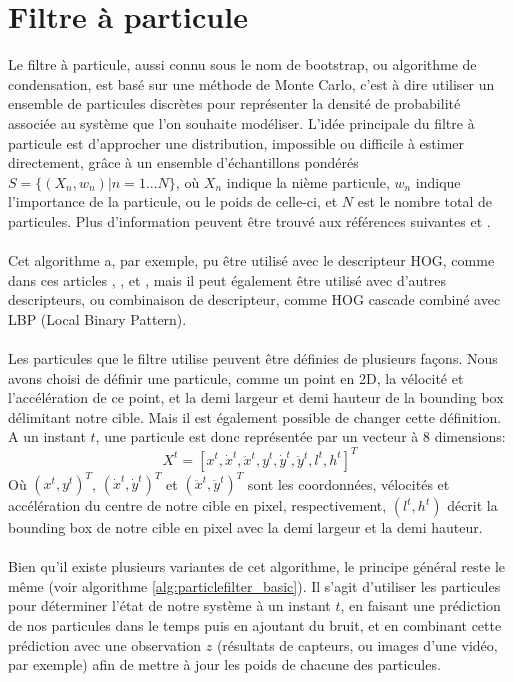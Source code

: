 \section{Filtre à particule}
Le filtre à particule, aussi connu sous le nom de bootstrap, ou algorithme de condensation, est basé sur une méthode de Monte Carlo, c'est à dire utiliser un ensemble de particules discrètes pour représenter la densité de probabilité associée au système que l'on souhaite modéliser. L'idée principale du filtre à particule est d'approcher une distribution, impossible ou difficile à estimer directement, grâce à un ensemble d'échantillons pondérés $S=\{(X_{n}, w_{n})|n=1...N\}$, où $X_{n}$ indique la nième particule, $w_{n}$ indique l'importance de la particule, ou le poids de celle-ci, et $N$ est le nombre total de particules. Plus d'information peuvent être trouvé aux références suivantes \cite{russell_norvig} et \cite{rlabbe}.\\
\\
Cet algorithme a, par exemple, pu être utilisé avec le descripteur HOG, comme dans ces articles \cite{xu_human_2010}, \cite{kong_particle_2019}, \cite{qiang_zhu_fast_2006} et \cite{dalal_histograms_2005}, mais il peut également être utilisé avec d'autres descripteurs, ou combinaison de descripteur, comme HOG cascade combiné avec LBP (Local Binary Pattern).\\
\\
Les particules que le filtre utilise peuvent être définies de plusieurs façons. Nous avons choisi de définir une particule, comme un point en 2D, la vélocité et l'accélération de ce point, et la demi largeur et demi hauteur de la bounding box délimitant notre cible. Mais il est également possible de changer cette définition.\\
A un instant $t$, une particule est donc représentée par un vecteur à 8 dimensions:
$$X^{t}=\left[ x^{t}, \dot{x}^{t}, \ddot{x}^{t}, y^{t}, \dot{y}^{t}, \ddot{y}^{t}, l^{t}, h^{t} \right]^{T}$$
Où $(x^{t}, y^{t})^{T}$, $(\dot{x}^{t}, \dot{y}^{t})^{T}$ et $(\ddot{x}^{t}, \ddot{y}^{t})^{T}$ sont les coordonnées, vélocités et accélération du centre de notre cible en pixel, respectivement, $(l^{t}, h^{t})$ décrit la bounding box de notre cible en pixel avec la demi largeur et la demi hauteur.\\
\\
Bien qu'il existe plusieurs variantes de cet algorithme, le principe général reste le même (voir algorithme \ref{alg:particlefilter_basic}). Il s'agit d'utiliser les particules pour déterminer l'état de notre système à un instant $t$, en faisant une prédiction de nos particules dans le temps puis en ajoutant du bruit, et en combinant cette prédiction avec une observation $z$ (résultats de capteurs, ou images d'une vidéo, par exemple) afin de mettre à jour les poids de chacune des particules.\\

